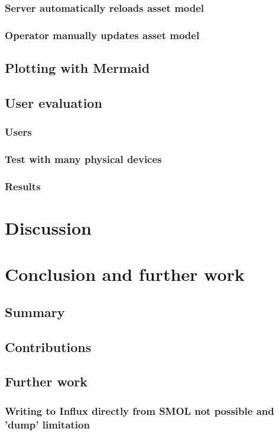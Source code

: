 \documentclass{article}
\begin{document}
\subsubsection{Server automatically reloads asset model}
\subsubsection{Operator manually updates asset model}
\subsection{Plotting with Mermaid}
\subsection{User evaluation}
\subsubsection{Users}
\subsubsection{Test with many physical devices}
\subsubsection{Results}




\newpage
\section{Discussion}\label{sec:Discussion}




\newpage
\section{Conclusion and further work}\label{sec:Conclusion}
\subsection{Summary}
\subsection{Contributions}
\subsection{Further work}
\subsubsection{Writing to Influx directly from SMOL not possible and 'dump' limitation}
\end{document}
